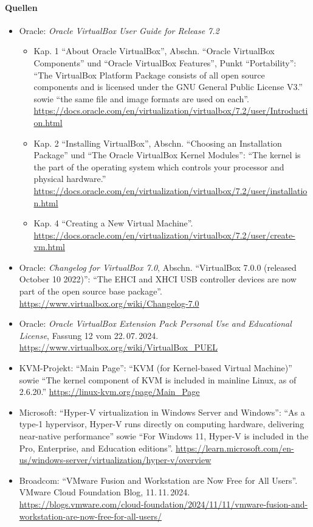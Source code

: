 \paragraph{Quellen}
\begin{itemize}[quellen]
  \item Oracle: \emph{Oracle VirtualBox User Guide for Release 7.2}
  \begin{itemize}[nosep]
    \item Kap. 1 \enquote{About Oracle VirtualBox}, Abschn. \enquote{Oracle VirtualBox Components} und \enquote{Oracle VirtualBox Features}, Punkt \enquote{Portability}: \enquote{The VirtualBox Platform Package consists of all open source components and is licensed under the GNU General Public License V3.} sowie \enquote{the same file and image formats are used on each}. \url{https://docs.oracle.com/en/virtualization/virtualbox/7.2/user/Introduction.html}
    \item Kap. 2 \enquote{Installing VirtualBox}, Abschn. \enquote{Choosing an Installation Package} und \enquote{The Oracle VirtualBox Kernel Modules}: \enquote{The kernel is the part of the operating system which controls your processor and physical hardware.} \url{https://docs.oracle.com/en/virtualization/virtualbox/7.2/user/installation.html}
    \item Kap. 4 \enquote{Creating a New Virtual Machine}. \url{https://docs.oracle.com/en/virtualization/virtualbox/7.2/user/create-vm.html}
  \end{itemize}
  \item Oracle: \emph{Changelog for VirtualBox 7.0}, Abschn. \enquote{VirtualBox 7.0.0 (released October 10 2022)}: \enquote{The EHCI and XHCI USB controller devices are now part of the open source base package}. \url{https://www.virtualbox.org/wiki/Changelog-7.0}
  \item Oracle: \emph{Oracle VirtualBox Extension Pack Personal Use and Educational License}, Fassung 12 vom 22.\,07.\,2024. \url{https://www.virtualbox.org/wiki/VirtualBox_PUEL}
  \item KVM-Projekt: \enquote{Main Page}: \enquote{KVM (for Kernel-based Virtual Machine)} sowie \enquote{The kernel component of KVM is included in mainline Linux, as of 2.6.20.} \url{https://linux-kvm.org/page/Main_Page}
  \item Microsoft: \enquote{Hyper-V virtualization in Windows Server and Windows}: \enquote{As a type-1 hypervisor, Hyper-V runs directly on computing hardware, delivering near-native performance} sowie \enquote{For Windows 11, Hyper-V is included in the Pro, Enterprise, and Education editions}. \url{https://learn.microsoft.com/en-us/windows-server/virtualization/hyper-v/overview}
  \item Broadcom: \enquote{VMware Fusion and Workstation are Now Free for All Users}. VMware Cloud Foundation Blog, 11.\,11.\,2024. \url{https://blogs.vmware.com/cloud-foundation/2024/11/11/vmware-fusion-and-workstation-are-now-free-for-all-users/}
\end{itemize}

